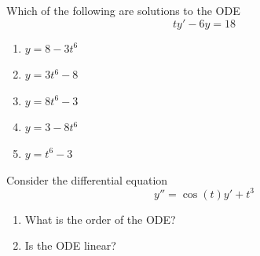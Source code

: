 \documentclass{workbook}
\begin{document}
\begin{slide}
	\question

	\begin{parts}
		\item Which of the following are solutions to the ODE
		\[
			ty'-6y=18
		\]
		\begin{minipage}{\textwidth}
		\begin{enumerate}
			\item $y=8-3t^6$
			\item $y=3t^6-8$
			\item $y=8t^6-3$
			\item $y=3-8t^6$
			\item $y=t^6-3$
		\end{enumerate}
	\end{minipage}

		\item Consider the differential equation
		\[
			y''=\cos (t) y'+t^3
		\]
		\begin{enumerate}
			\item What is the order of the ODE?
			\item Is the ODE linear?
		\end{enumerate}
	\end{parts}
\end{slide}
\end{document}
